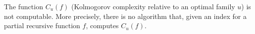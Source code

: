 The function $C_u(f)$ (Kolmogorov complexity relative to an optimal family $u$) is not computable. More precisely, there is no algorithm that, given an index for a partial recursive function $f$, computes $C_u(f)$.

